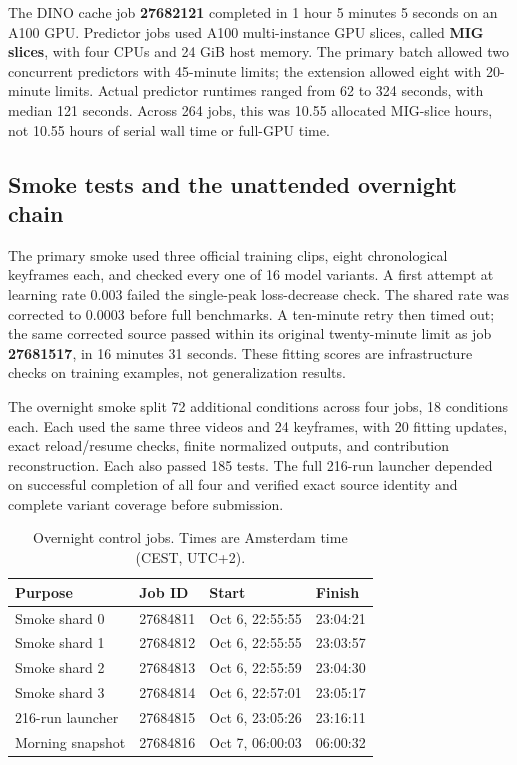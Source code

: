 \documentclass[11pt,a4paper]{article}
\begin{document}
The DINO cache job \textbf{27682121} completed in 1 hour 5 minutes 5 seconds on an A100 GPU. Predictor jobs used A100 multi-instance GPU slices, called \textbf{MIG slices}, with four CPUs and 24 GiB host memory. The primary batch allowed two concurrent predictors with 45-minute limits; the extension allowed eight with 20-minute limits. Actual predictor runtimes ranged from 62 to 324 seconds, with median 121 seconds. Across 264 jobs, this was 10.55 allocated MIG-slice hours, not 10.55 hours of serial wall time or full-GPU time.

\subsection{Smoke tests and the unattended overnight chain}
The primary smoke used three official training clips, eight chronological keyframes each, and checked every one of 16 model variants. A first attempt at learning rate 0.003 failed the single-peak loss-decrease check. The shared rate was corrected to 0.0003 before full benchmarks. A ten-minute retry then timed out; the same corrected source passed within its original twenty-minute limit as job \textbf{27681517}, in 16 minutes 31 seconds. These fitting scores are infrastructure checks on training examples, not generalization results.

The overnight smoke split 72 additional conditions across four jobs, 18 conditions each. Each used the same three videos and 24 keyframes, with 20 fitting updates, exact reload/resume checks, finite normalized outputs, and contribution reconstruction. Each also passed 185 tests. The full 216-run launcher depended on successful completion of all four and verified exact source identity and complete variant coverage before submission.

\begin{table}[htbp]\centering\small
\caption{Overnight control jobs. Times are Amsterdam time (CEST, UTC+2).}
\begin{tabular}{llll}\toprule
Purpose & Job ID & Start & Finish\\\midrule
Smoke shard 0 & 27684811 & Oct 6, 22:55:55 & 23:04:21\\
Smoke shard 1 & 27684812 & Oct 6, 22:55:55 & 23:03:57\\
Smoke shard 2 & 27684813 & Oct 6, 22:55:59 & 23:04:30\\
Smoke shard 3 & 27684814 & Oct 6, 22:57:01 & 23:05:17\\
216-run launcher & 27684815 & Oct 6, 23:05:26 & 23:16:11\\
Morning snapshot & 27684816 & Oct 7, 06:00:03 & 06:00:32\\\bottomrule
\end{tabular}\end{table}
\end{document}
